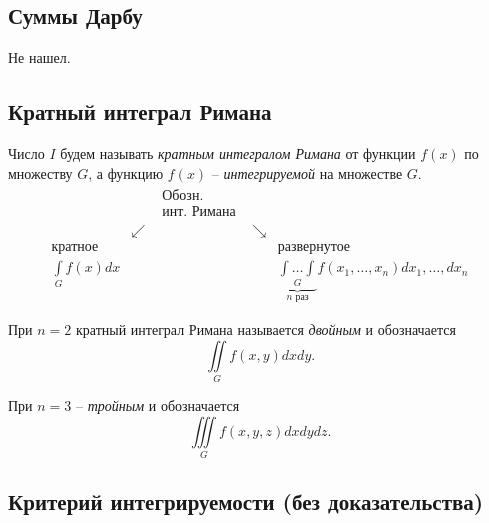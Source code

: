 \subsection{Суммы Дарбу}

Не нашел.

\newpage

\subsection{Кратный интеграл Римана}

\begin{note}
    Число $ I $ будем называть \emph{кратным интегралом Римана} от функции $ f(x) $ по множеству $ G $, а функцию $ f(x) $ -- \emph{интегрируемой} на множестве $ G $.
    \[
        \begin{array}{ccccc}
                                      &          & \begin{array}{cc}
                                                       \text{Обозн.} \\
                                                       \text{инт. Римана}
                                                   \end{array} &          &                                                                                                    \\
                                      & \swarrow &                    & \searrow &                                                                                             \\
            \text{кратное}            &          &                    &          & \text{развернутое}                                                                          \\
            \underset{G}{\int} f(x)dx &          &                    &          & \underbrace{\underset{G}{\int\ldots\int}}_{n \text{ раз}}f(x_1,\ldots,x_n)dx_1,\ldots,d x_n
        \end{array}
    \]

    При $ n=2 $ кратный интеграл Римана называется \emph{двойным} и обозначается
    \[
        \iint\limits_G f(x,y)dxdy.
    \]

    При $ n=3 $ -- \emph{тройным} и обозначается
    \[
        \iiint\limits_G f(x,y,z)dxdydz.
    \]
\end{note}

\subsection{Критерий интегрируемости (без доказательства)}

